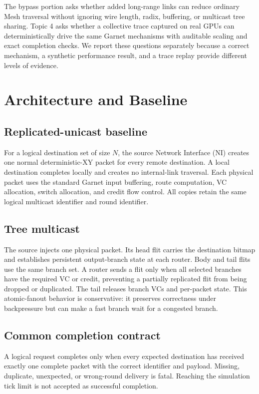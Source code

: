 \documentclass[10pt]{article}
\begin{document}
The bypass portion asks whether added long-range links can reduce ordinary
Mesh traversal without ignoring wire length, radix, buffering, or multicast
tree sharing.  Topic 4 asks whether a collective trace captured on real GPUs
can deterministically drive the same Garnet mechanisms with auditable scaling
and exact completion checks.  We report these questions separately because a
correct mechanism, a synthetic performance result, and a trace replay provide
different levels of evidence.

\section{Architecture and Baseline}

\subsection{Replicated-unicast baseline}

For a logical destination set of size $N$, the source Network Interface (NI)
creates one normal deterministic-XY packet for every remote destination.  A
local destination completes locally and creates no internal-link traversal.
Each physical packet uses the standard Garnet input buffering, route
computation, VC allocation, switch allocation, and credit flow control.  All
copies retain the same logical multicast identifier and round identifier.

\subsection{Tree multicast}

The source injects one physical packet.  Its head flit carries the destination
bitmap and establishes persistent output-branch state at each router.  Body
and tail flits use the same branch set.  A router sends a flit only when all
selected branches have the required VC or credit, preventing a partially
replicated flit from being dropped or duplicated.  The tail releases branch
VCs and per-packet state.  This atomic-fanout behavior is conservative: it
preserves correctness under backpressure but can make a fast branch wait for
a congested branch.

\subsection{Common completion contract}

A logical request completes only when every expected destination has received
exactly one complete packet with the correct identifier and payload.  Missing,
duplicate, unexpected, or wrong-round delivery is fatal.  Reaching the
simulation tick limit is not accepted as successful completion.
\end{document}
